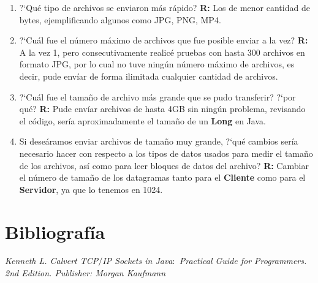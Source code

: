 \documentclass[12pt,twoside]{article}
\begin{document}
\begin{enumerate}
\item ?`Qu\'e tipo de archivos se enviaron m\'as r\'apido?
\newline \textbf{R:} Los de menor cantidad de bytes, ejemplificando algunos como JPG, PNG, MP4.

\item ?`Cu\'al fue el n\'umero m\'aximo de archivos que fue posible enviar a la vez?
\newline \textbf{R:} A la vez 1, pero consecutivamente realic\'e pruebas con hasta 300 archivos en formato JPG, por lo cual no tuve ning\'un n\'umero m\'aximo de archivos, es decir, pude env\'iar de forma ilimitada cualquier cantidad de archivos.

\item ?`Cu\'al fue el tama\~no de archivo m\'as grande que se pudo transferir? ?`por qu\'e?
\newline \textbf{R:} Pude env\'iar archivos de hasta 4GB sin ning\'un problema, revisando el c\'odigo, ser\'ia aproximadamente el tama\~no de un \textbf{Long} en Java.

\item Si dese\'aramos enviar archivos de tama\~no muy grande, ?`qu\'e cambios ser\'ia necesario hacer con respecto a los tipos de datos usados para medir el tama\~no de los archivos, as\'i como para leer bloques de datos del archivo?
\newline \textbf{R:} Cambiar el n\'umero de tama\~no de los datagramas tanto para el \textbf{Cliente} como para el \textbf{Servidor}, ya que lo tenemos en 1024.


\end{enumerate}

\section{Bibliograf\'ia}
\begin{thebibliography}{X}	
  \textit{Kenneth L. Calvert TCP$/$IP Sockets in Java$:$ Practical Guide for Programmers. 2nd Edition. Publisher: Morgan Kaufmann}

\end{thebibliography}
\end{document}
